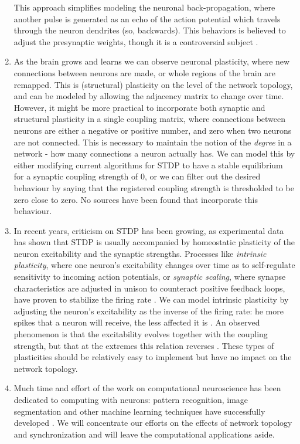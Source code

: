 \begin{enumerate}
This approach simplifies modeling the neuronal back-propagation, where another pulse is generated as an echo of the action potential which travels through the neuron dendrites (so, backwards). This behaviors is believed to adjust the presynaptic weights, though it is a controversial subject \cite{Gerstner2002}.


\item As the brain grows and learns we can observe neuronal plasticity, where new connections between neurons are made, or whole regions of the brain are remapped. This is (structural) plasticity on the level of the network topology, and can be modeled by allowing the adjacency matrix to change over time.
However, it might be more practical to incorporate both synaptic and structural plasticity in a single coupling matrix, where connections between neurons are either a negative or positive number, and zero when two neurons are not connected. This is necessary to maintain the notion of the \textsl{degree} in a network - how many connections a neuron actually has. We can model this by either modifying current algorithms for STDP to have a stable equilibrium for a synaptic coupling strength of 0, or we can filter out the desired behaviour by saying that the registered coupling strength is thresholded to be zero close to zero. No sources have been found that incorporate this behaviour.


\item In recent years, criticism on STDP has been growing, as experimental data has shown that STDP is usually accompanied by homeostatic plasticity of the neuron excitability and the synaptic strengths. Processes like \textsl{intrinsic plasticity}, where one neuron's excitability changes over time as to self-regulate sensitivity to incoming action potentials, or \textsl{synaptic scaling}, where synapse characteristics are adjusted in unison to counteract positive feedback loops, have proven to stabilize the firing rate \cite{ChrolCannon2014, Kirkwood2019}. We can model intrinsic plasticity by adjusting the neuron's excitability as the inverse of the firing rate: he more spikes that a neuron will receive, the less affected it is \cite{LiXueSong2017}. An observed phenomenon is that the excitability evolves together with the coupling strength, but that at the extremes this relation reverses \cite{Debanne2017, Debanne2018}.  These types of plasticities should be relatively easy to implement but have no impact on the network topology.


\item Much time and effort of the work on computational neuroscience has been dedicated to computing with neurons: pattern recognition, image segmentation and other machine learning techniques have successfully developed \cite{ChrolCannon2014, LiXueSong2017, Hoppensteadt2001CanonicalNM}. We will concentrate our efforts on the effects of network topology and synchronization and will leave the computational applications aside.

\end{enumerate}


\small{}

\label{LastPage}~



